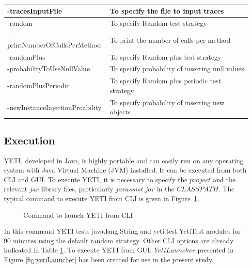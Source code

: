 \begin{table}[H]
{{\begin{tabular}{|l|l|}
-tracesInputFile					&To specify the file to input traces 					\\ \hline
-random						&To specify Random test strategy					\\ \hline
-printNumberOfCallsPerMethod	&To print the number of calls per method			\\ \hline
-randomPlus						&To specify Random plus test strategy				\\ \hline
-probabilityToUseNullValue		&To specify probability of inserting null values		\\ \hline
-randomPlusPeriodic				&To specify Random plus periodic test strategy		\\ \hline
-newInstanceInjectionProability	&To specify probability of inserting new objects		\\ \hline

\hline %
\end{tabular}
}}
\bigskip
\label{table:cliOptions} %
\end{table}


\subsection{Execution}
YETI, developed in Java, is highly portable and can easily run on any operating system with Java Virtual Machine (JVM) installed. It can be executed from both CLI and GUI. To execute YETI, it is necessary to specify the $project$ and the relevant $jar$ library files, particularly $javassist.jar$ in the $CLASSPATH$. The typical command to execute YETI from CLI is given in Figure~\ref{fig:yeticommand}.\\

\begin{figure}[h!]
	\centering
	\caption{Command to launch YETI from CLI}
	\label{fig:yeticommand}
\end{figure}

\bigskip
In this command YETI tests java.lang.String and yeti.test.YetiTest modules for 90 minutes using the default random strategy. Other CLI options are already indicated in Table \ref{table:cliOptions}. To execute YETI from GUI, $YetiLauncher$ presented in Figure \ref{fig:yetiLauncher} has been created for use in the present study.

